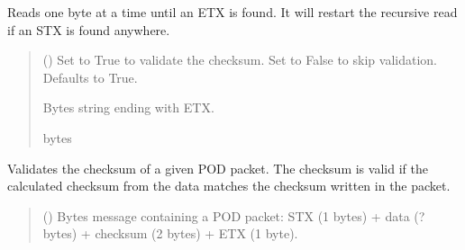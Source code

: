 \documentclass[letterpaper,10pt,english]{sphinxmanual}
\begin{document}
\begin{fulllineitems}
\begin{fulllineitems}
\end{fulllineitems}


\begin{fulllineitems}
\label{\detokenize{BasicPodProtocol:BasicPodProtocol.POD_Basics._Read_ToETX}}
\pysigstartsignatures
{}
\pysigstopsignatures
\sphinxAtStartPar
Reads one byte at a time until an ETX is found. It will restart the recursive read if an STX         is found anywhere.
\begin{quote}\begin{description}
\sphinxAtStartPar
{} (\sphinxstyleliteralemphasis{\sphinxupquote{, }}) \textendash{} Set to True to validate the checksum. Set to False to skip                 validation. Defaults to True.

\sphinxAtStartPar
Bytes string ending with ETX.

\sphinxAtStartPar
bytes

\end{description}\end{quote}

\end{fulllineitems}


\begin{fulllineitems}
\label{\detokenize{BasicPodProtocol:BasicPodProtocol.POD_Basics._ValidateChecksum}}
\pysigstartsignatures
{}
\pysigstopsignatures
\sphinxAtStartPar
Validates the checksum of a given POD packet. The checksum is valid if the calculated checksum
from the data matches the checksum written in the packet.
\begin{quote}\begin{description}
\sphinxAtStartPar
{} () \textendash{} Bytes message containing a POD packet: STX (1 bytes) + data (? bytes) + checksum                 (2 bytes) + ETX (1 byte).


\end{description}
\end{quote}
\end{fulllineitems}
\end{fulllineitems}
\end{document}
